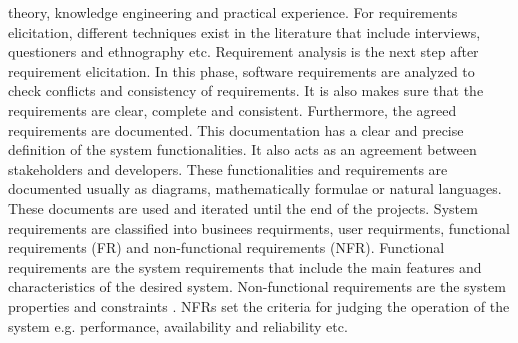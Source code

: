 theory, knowledge engineering and practical experience. For requirements elicitation, different
techniques exist in the literature that include interviews, questioners and ethnography etc.
Requirement analysis \cite{Nuseibeh:2000:RER:336512.336523} is the next step after requirement elicitation. In this phase, software
requirements are analyzed to check conflicts and consistency of requirements. It is also makes
sure that the requirements are clear, complete and consistent. Furthermore, the agreed
requirements are documented. This documentation has a clear and precise definition of the
system functionalities. It also acts as an agreement between stakeholders and developers. These
functionalities and requirements are documented usually as diagrams, mathematically formulae
or natural languages. These documents are used and iterated until the end of the projects.
System requirements are classified into businees requirments, user requirments, functional requirements (FR) 
and non-functional requirements (NFR). Functional requirements are the system requirements that include the main
features and characteristics of the desired system. Non-functional requirements are the system
properties and constraints \cite{Davis:1993:SRO:113586}. NFRs set the criteria for judging the operation of the system e.g.
performance, availability and reliability etc.